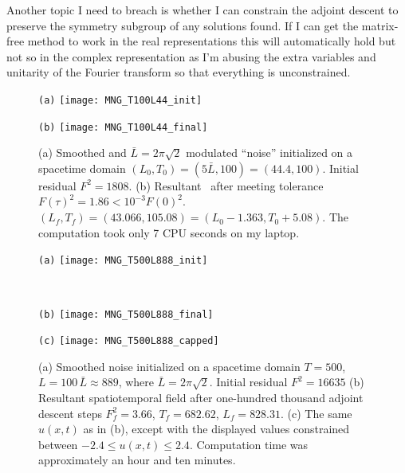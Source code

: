 Another topic I need to breach is whether I can constrain the adjoint descent to
 preserve the symmetry subgroup of any solutions found. If I can get the matrix-free
  method to work in the real representations this will automatically hold but not
   so in the complex representation as I'm abusing the extra variables and unitarity
    of the Fourier transform so that everything is unconstrained.

\begin{figure}[ht]
\begin{minipage}[height=.32\textheight]{.45\textwidth}
\centering \small{\texttt{(a)}}
\texttt{[image: MNG\_T100L44\_init]}
\end{minipage}
\begin{minipage}[height=.32\textheight]{.45\textwidth}
\centering \small{\texttt{(b)}}
\texttt{[image: MNG\_T100L44\_final]}
\end{minipage}
\caption{ \label{fig:MNG_spacetime_smoothed}
(a) Smoothed and $\bar{L}=2\pi\sqrt{2}$ modulated ``noise''
initialized on a spacetime domain
$(L_0,T_0)=(5\bar{L},100)=(44.4,100)$. Initial residual $F^2 = 1808$.
(b) Resultant \twot\ after meeting tolerance
$F(\tau)^2= 1.86<10^{-3} F(0)^2$.
$(L_f,T_f)=(43.066,105.08) = (L_0 - 1.363,T_0 + 5.08)$.
The computation took only 7 CPU seconds on my laptop.
}
\end{figure}

\begin{figure}
\begin{minipage}[height=.32\textheight]{.45\textwidth}
\centering \small{\texttt{(a)}}
\texttt{[image: MNG\_T500L888\_init]}
\end{minipage}
\\
\begin{minipage}[height=.32\textheight]{.45\textwidth}
\centering \small{\texttt{(b)}}
\texttt{[image: MNG\_T500L888\_final]}
\end{minipage}
\begin{minipage}[height=.32\textheight]{.45\textwidth}
\centering \small{\texttt{(c)}}
\texttt{[image: MNG\_T500L888\_capped]}
\end{minipage}
\caption{ \label{fig:MNG_spacetime_capped}
(a) Smoothed noise initialized on a spacetime domain $T=500$,
$L=100\,\bar{L} \approx 889$, where $\bar{L}=2\pi\sqrt{2}$.
Initial residual $F^2 = 16635$
(b) Resultant spatiotemporal field after one-hundred thousand adjoint descent
steps $F^2_f = 3.66$, $T_f = 682.62$, $L_f=828.31$.
(c) The same $u(x,t)$ as in (b), except with the displayed values constrained
between $-2.4 \leq u(x,t) \leq 2.4$. Computation time was approximately an hour
and ten minutes.
}
\end{figure}


